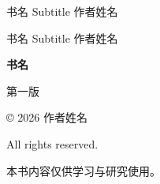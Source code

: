 
\BookChapter{ }{  }%
\begin{bilingualtext}
\bi{%

}{%

}
\end{bilingualtext}%
\begin{bilingualtext}

\end{bilingualtext}%




\begin{center}
\raisebox{5mm}{\rule{0.6\linewidth}{0.4pt}}
\end{center}
\vspace{0.3pt}%

\bi{%

}{%

}


\frontmatter

\begin{titlepage}
    \thispagestyle{empty}
    \centering
    \vspace*{25mm}
    {\fontsize{30pt}{36pt}\selectfont 书名}
    \vspace{8mm}
    {\fontsize{13pt}{17pt}\selectfont Subtitle}
    \vfill
    {\fontsize{11pt}{15pt}\selectfont 作者姓名}
\end{titlepage}

\cleardoublepage

\thispagestyle{empty}
\begin{center}
    \vspace*{35mm}
    {\fontsize{25pt}{31pt}\selectfont 书名}
    \vspace{5mm}
    {\fontsize{12pt}{16pt}\selectfont Subtitle}
    \vfill
    作者姓名
\end{center}

\cleardoublepage

\thispagestyle{empty}
\vspace*{\fill}
{\small
\textbf{书名}
\vspace{4mm}

第一版
\vspace{4mm}

© 2026 作者姓名
\vspace{4mm}

All rights reserved.
\vspace{10mm}

本书内容仅供学习与研究使用。
}
\vspace*{25mm}

